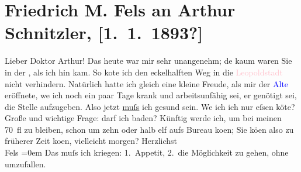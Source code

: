 

               \section[Friedrich M. Fels an Arthur Schnitzler, {[}1. 1. 1893?{]}]{ Friedrich M. Fels an Arthur Schnitzler, {[}1. 1. 1893?{]}}\nopagebreak{}\rehead{ }\normalsize\beginnumbering{} \toendnotes[C]{\smallbreak\pagebreak[2]} 
\toendnotes[C]{\smallbreak}\pstart
           \noindent{}{\pb}Lieber Doktor Arthur! Das \label{K_L00154_1v}\label{K_L00154_1h} heute
                    war mir sehr unangenehm; de{\geminationn} kaum waren Sie in der
                        \label{K_L00154_2v}\label{K_L00154_2h}, als
                    ich hin kam. So ko{\geminationn}te ich den eckelhalften Weg in
                    die \textcolor{pink}{Leopoldstadt}{}\ledrightnote{\textcolor{pink}{II., Leopoldstadt}} nicht verhindern. Natürlich
                    hatte ich gleich eine kleine Freude, als mir der \textcolor{blue}{Alte}{} eröffnete, we{\geminationn} ich
                    noch ein paar Tage krank und arbeitsunfähig sei, er genötigt sei, die Stelle
                    aufzugeben. Also jetzt \uline{muſs} ich gesund sein.
                        We{\geminationn} ich ich nur eſsen kö{\geminationn}te? Große und wichtige Frage: darf ich baden?\pend
           \pstart
           Künftig werde ich, um bei meinen 70 fl zu bleiben, schon um zehn oder halb elf
                    aufs Bureau ko{\geminationm}en; Sie kö{\geminationn}en also zu früherer Zeit ko{\geminationm}en, vielleicht morgen?\pend
           \pstart
           Herzlichst{\\[\baselineskip]}\spacefill\mbox{Fels}\pend
           \leftskip=0em{}\pstart
           \noindent{}Das muſs ich kriegen: 1. Appetit, 2. die Möglichkeit zu gehen, ohne
                        umzufallen.\pend
           \endnumbering{}  
      